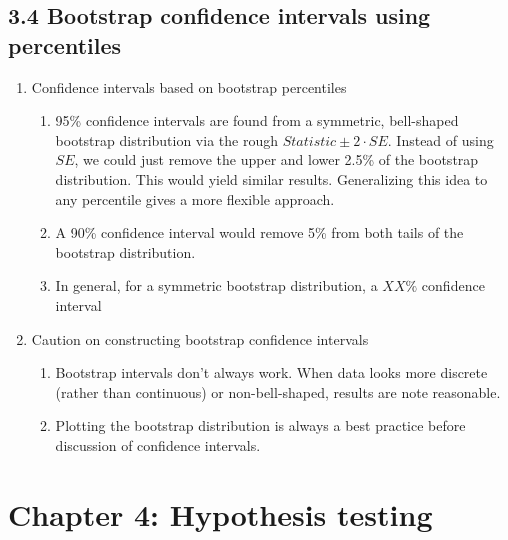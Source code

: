 \documentclass{article}
\begin{document}
\subsection{3.4 Bootstrap confidence intervals using percentiles}
\begin{enumerate}

\item Confidence intervals based on bootstrap percentiles
\begin{enumerate}
\item 95\% confidence intervals are found from a symmetric, bell-shaped bootstrap distribution via the rough $Statistic \pm 2 \cdot SE$. Instead of using $SE$, we could just remove the upper and lower 2.5\% of the bootstrap distribution. This would yield similar results. Generalizing this idea to any percentile gives a more flexible approach.
\item A 90\% confidence interval would remove 5\% from both tails of the bootstrap distribution.
\item In general, for a symmetric bootstrap distribution, a $XX \%$ confidence interval 
\end{enumerate}

\item Caution on constructing bootstrap confidence intervals
\begin{enumerate}
\item Bootstrap intervals don't always work. When data looks more discrete (rather than continuous) or non-bell-shaped, results are note reasonable. 
\item Plotting the bootstrap distribution is always a best practice before discussion of confidence intervals.
\end{enumerate}

\end{enumerate}

\section{Chapter 4: Hypothesis testing}

\end{document}
